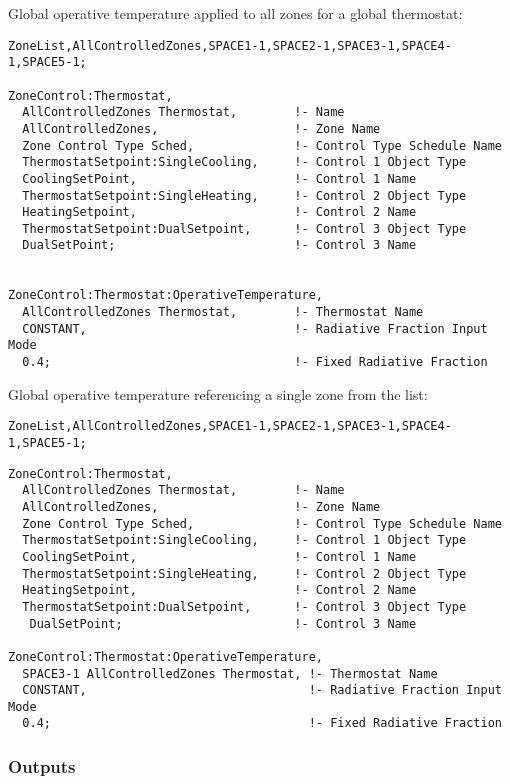 Global operative temperature applied to all zones for a global thermostat:

\begin{lstlisting}
ZoneList,AllControlledZones,SPACE1-1,SPACE2-1,SPACE3-1,SPACE4-1,SPACE5-1;

ZoneControl:Thermostat,
  AllControlledZones Thermostat,        !- Name
  AllControlledZones,                   !- Zone Name
  Zone Control Type Sched,              !- Control Type Schedule Name
  ThermostatSetpoint:SingleCooling,     !- Control 1 Object Type
  CoolingSetPoint,                      !- Control 1 Name
  ThermostatSetpoint:SingleHeating,     !- Control 2 Object Type
  HeatingSetpoint,                      !- Control 2 Name
  ThermostatSetpoint:DualSetpoint,      !- Control 3 Object Type
  DualSetPoint;                         !- Control 3 Name


ZoneControl:Thermostat:OperativeTemperature,
  AllControlledZones Thermostat,        !- Thermostat Name
  CONSTANT,                             !- Radiative Fraction Input Mode
  0.4;                                  !- Fixed Radiative Fraction
\end{lstlisting}

Global operative temperature referencing a single zone from the list:

\begin{lstlisting}
ZoneList,AllControlledZones,SPACE1-1,SPACE2-1,SPACE3-1,SPACE4-1,SPACE5-1;
\end{lstlisting}

\begin{lstlisting}
ZoneControl:Thermostat,
  AllControlledZones Thermostat,        !- Name
  AllControlledZones,                   !- Zone Name
  Zone Control Type Sched,              !- Control Type Schedule Name
  ThermostatSetpoint:SingleCooling,     !- Control 1 Object Type
  CoolingSetPoint,                      !- Control 1 Name
  ThermostatSetpoint:SingleHeating,     !- Control 2 Object Type
  HeatingSetpoint,                      !- Control 2 Name
  ThermostatSetpoint:DualSetpoint,      !- Control 3 Object Type
   DualSetPoint;                        !- Control 3 Name

ZoneControl:Thermostat:OperativeTemperature,
  SPACE3-1 AllControlledZones Thermostat, !- Thermostat Name
  CONSTANT,                               !- Radiative Fraction Input Mode
  0.4;                                    !- Fixed Radiative Fraction
\end{lstlisting}

\subsubsection{Outputs}\label{outputs-1-032}

